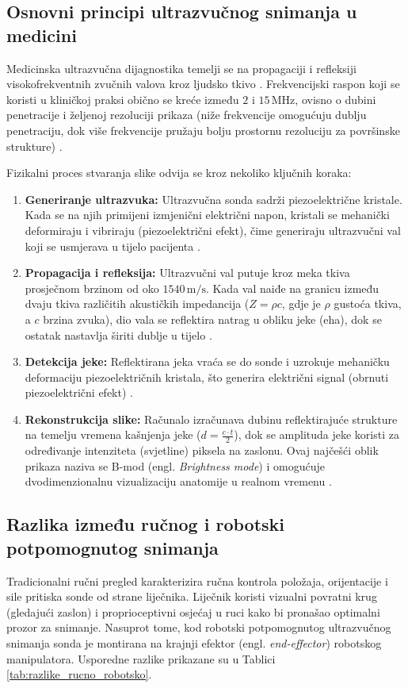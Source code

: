 \subsection{Osnovni principi ultrazvučnog snimanja u medicini}
Medicinska ultrazvučna dijagnostika temelji se na propagaciji i refleksiji visokofrekventnih zvučnih valova kroz ljudsko tkivo \cite{vonhaxthausen2021medical}. Frekvencijski raspon koji se koristi u kliničkoj praksi obično se kreće između $2$ i $15\,\text{MHz}$, ovisno o dubini penetracije i željenoj rezoluciji prikaza (niže frekvencije omogućuju dublju penetraciju, dok više frekvencije pružaju bolju prostornu rezoluciju za površinske strukture) \cite{qin2026review, mdpi2026review}.

Fizikalni proces stvaranja slike odvija se kroz nekoliko ključnih koraka:
\begin{enumerate}
    \item \textbf{Generiranje ultrazvuka:} Ultrazvučna sonda sadrži piezoelektrične kristale. Kada se na njih primijeni izmjenični električni napon, kristali se mehanički deformiraju i vibriraju (piezoelektrični efekt), čime generiraju ultrazvučni val koji se usmjerava u tijelo pacijenta \cite{ieee2025survey}.
    \item \textbf{Propagacija i refleksija:} Ultrazvučni val putuje kroz meka tkiva prosječnom brzinom od oko $1540\,\text{m/s}$. Kada val naiđe na granicu između dvaju tkiva različitih akustičkih impedancija ($Z = \rho c$, gdje je $\rho$ gustoća tkiva, a $c$ brzina zvuka), dio vala se reflektira natrag u obliku jeke (eha), dok se ostatak nastavlja širiti dublje u tijelo \cite{vonhaxthausen2021medical}.
    \item \textbf{Detekcija jeke:} Reflektirana jeka vraća se do sonde i uzrokuje mehaničku deformaciju piezoelektričnih kristala, što generira električni signal (obrnuti piezoelektrični efekt) \cite{jiang2023robotic}.
    \item \textbf{Rekonstrukcija slike:} Računalo izračunava dubinu reflektirajuće strukture na temelju vremena kašnjenja jeke ($d = \frac{c \cdot t}{2}$), dok se amplituda jeke koristi za određivanje intenziteta (svjetline) piksela na zaslonu. Ovaj najčešći oblik prikaza naziva se B-mod (engl. \textit{Brightness mode}) i omogućuje dvodimenzionalnu vizualizaciju anatomije u realnom vremenu \cite{vonhaxthausen2021medical, akbari2021robotic}.
\end{enumerate}

\subsection{Razlika između ručnog i robotski potpomognutog snimanja}
Tradicionalni ručni pregled karakterizira ručna kontrola položaja, orijentacije i sile pritiska sonde od strane liječnika. Liječnik koristi vizualni povratni krug (gledajući zaslon) i proprioceptivni osjećaj u ruci kako bi pronašao optimalni prozor za snimanje.
Nasuprot tome, kod robotski potpomognutog ultrazvučnog snimanja sonda je montirana na krajnji efektor (engl. \textit{end-effector}) robotskog manipulatora. Usporedne razlike prikazane su u Tablici \ref{tab:razlike_rucno_robotsko}.

